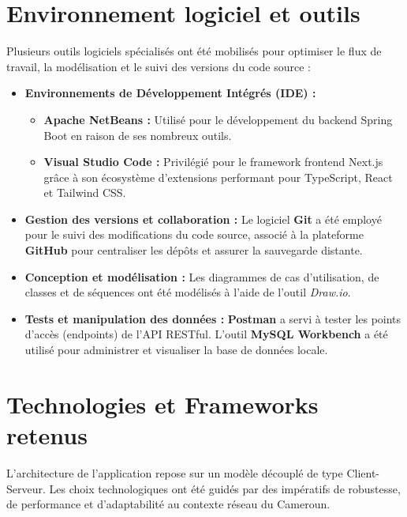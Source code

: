 \documentclass[12pt,a4paper]{report}
\begin{document}
	\section{Environnement logiciel et outils}
	Plusieurs outils logiciels spécialisés ont été mobilisés pour optimiser le flux de travail, la modélisation et le suivi des versions du code source :
	\begin{itemize}
		\item \textbf{Environnements de Développement Intégrés (IDE) :} 
		\begin{itemize}
			\item \textbf{Apache NetBeans :} Utilisé pour le développement du backend Spring Boot en raison de ses nombreux outils.
			\item \textbf{Visual Studio Code :} Privilégié pour le framework frontend Next.js grâce à son écosystème d'extensions performant pour TypeScript, React et Tailwind CSS.
		\end{itemize}
		\item \textbf{Gestion des versions et collaboration :} Le logiciel \textbf{Git} a été employé pour le suivi des modifications du code source, associé à la plateforme \textbf{GitHub} pour centraliser les dépôts et assurer la sauvegarde distante.
		\item \textbf{Conception et modélisation :} Les diagrammes de cas d'utilisation, de classes et de séquences ont été modélisés à l'aide de l'outil \textit{Draw.io}.
		\item \textbf{Tests et manipulation des données :} \textbf{Postman} a servi à tester les points d'accès (endpoints) de l'API RESTful. L'outil \textbf{MySQL Workbench} a été utilisé pour administrer et visualiser la base de données locale.
	\end{itemize}
	
	\section{Technologies et Frameworks retenus}
	L'architecture de l'application repose sur un modèle découplé de type Client-Serveur. Les choix technologiques ont été guidés par des impératifs de robustesse, de performance et d'adaptabilité au contexte réseau du Cameroun.
	
\end{document}
